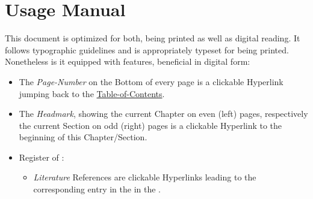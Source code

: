%
\section{Usage Manual}

This document is optimized for both, being printed as well as digital reading.
It follows typographic guidelines and is appropriately typeset for being printed.
Nonetheless is it equipped with features, beneficial in digital form:

\begin{itemize}
\item
    The \textit{Page-Number} on the Bottom of every page is a clickable Hyperlink jumping back to the \hyperref[chap:ToC]{Table-of-Contents}.
\item
    The \textit{Headmark}, showing the current Chapter on even (left) pages, respectively the current Section on odd (right) pages is a clickable Hyperlink to the beginning of this Chapter/Section.
\item
    Register of \hyperref[chap:literature]{}:
    \begin{itemize}
    \item
        \textit{Literature} References are clickable Hyperlinks leading to the corresponding entry in the \hyperref[chap:literature]{} in the .

\end{itemize}
\end{itemize}
